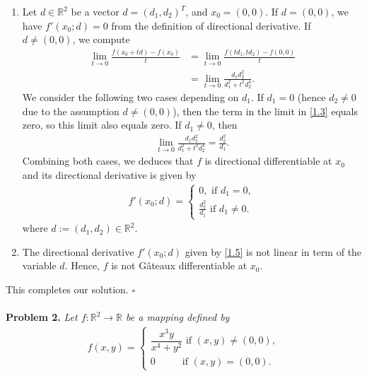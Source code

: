\documentclass[a4paper]{article}
\numberwithin{equation}{section}
\begin{document}
\begin{enumerate}
\item Let $d\in \mathbb{R}^2$ be a vector $d=\left(d_1,d_2\right)^T$, and $x_0=\left(0,0\right)$. If $d=\left(0,0\right)$, we have $f'\left(x_0;d\right) =0$ from the definition of directional derivative. If $d\ne \left(0,0\right)$, we compute
\begin{align}
\mathop {\lim }\limits_{t \to 0} \frac{{f\left( {{x_0} + td} \right) - f\left( {{x_0}} \right)}}{t} &= \mathop {\lim }\limits_{t \to 0} \frac{{f\left( {t{d_1},t{d_2}} \right) - f\left( {0,0} \right)}}{t} \\
 &= \mathop {\lim }\limits_{t \to 0} \frac{{{d_1}d_2^2}}{{d_1^2 + {t^2}d_2^4}}. \label{1.3}
\end{align}
We consider the following two cases depending on $d_1$. If $d_1 =0$ (hence $d_2\ne 0$ due to the assumption $d\ne \left(0,0\right)$), then the term in the limit in \eqref{1.3} equals zero, so this limit also equals zero. If $d_1\ne 0$, then
\begin{align}
\mathop {\lim }\limits_{t \to 0} \frac{{{d_1}d_2^2}}{{d_1^2 + {t^2}d_2^4}} = \frac{{d_2^2}}{{{d_1}}}.
\end{align}
Combining both cases, we deduces that $f$ is directional differentiable at $x_0$ and its directional derivative is given by 
\begin{align}
\label{1.5}
f'\left( {{x_0};d} \right) = \left\{ {\begin{array}{*{20}{c}}
{0,\mbox{ if } {d_1} = 0,}\\
{\frac{{d_2^2}}{{{d_1}}}\mbox{ if } {d_1} \ne 0.}
\end{array}} \right.
\end{align}
where $d:=\left(d_1,d_2\right) \in \mathbb{R}^2$. 
\item The directional derivative $f'\left( {{x_0};d} \right)$ given by \eqref{1.5} is not linear in term of the variable $d$. Hence, $f$ is not G\^{a}teaux differentiable at $x_0$.\end{enumerate}
This completes our solution. \hfill $\square$\\
\\
\textbf{Problem 2.} \textit{Let $f:\mathbb{R}^2\to \mathbb{R}$ be a mapping defined by}
\begin{align}
f\left( {x,y} \right) = \left\{ {\begin{array}{*{20}{c}}
{\dfrac{{{x^3}y}}{{{x^4} + {y^2}}}\mbox{ if } \left( {x,y} \right) \ne \left( {0,0} \right),}\\
{0 \hspace{1cm} \mbox{ if } \left( {x,y} \right) = \left( {0,0} \right).}
\end{array}} \right.
\end{align}
\end{document}
